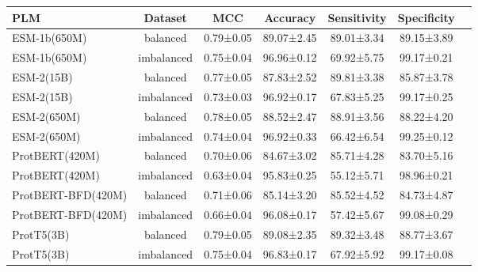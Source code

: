 \begin{tabular}{lcccccc}
\toprule
               PLM &    Dataset &       MCC &   Accuracy & Sensitivity & Specificity \\
\midrule
      ESM-1b(650M) &   balanced & 0.79±0.05 & 89.07±2.45 &  89.01±3.34 &  89.15±3.89 \\
      ESM-1b(650M) & imbalanced & 0.75±0.04 & 96.96±0.12 &  69.92±5.75 &  99.17±0.21 \\
        ESM-2(15B) &   balanced & 0.77±0.05 & 87.83±2.52 &  89.81±3.38 &  85.87±3.78 \\
        ESM-2(15B) & imbalanced & 0.73±0.03 & 96.92±0.17 &  67.83±5.25 &  99.17±0.25 \\
       ESM-2(650M) &   balanced & 0.78±0.05 & 88.52±2.47 &  88.91±3.56 &  88.22±4.20 \\
       ESM-2(650M) & imbalanced & 0.74±0.04 & 96.92±0.33 &  66.42±6.54 &  99.25±0.12 \\
    ProtBERT(420M) &   balanced & 0.70±0.06 & 84.67±3.02 &  85.71±4.28 &  83.70±5.16 \\
    ProtBERT(420M) & imbalanced & 0.63±0.04 & 95.83±0.25 &  55.12±5.71 &  98.96±0.21 \\
ProtBERT-BFD(420M) &   balanced & 0.71±0.06 & 85.14±3.20 &  85.52±4.52 &  84.73±4.87 \\
ProtBERT-BFD(420M) & imbalanced & 0.66±0.04 & 96.08±0.17 &  57.42±5.67 &  99.08±0.29 \\
        ProtT5(3B) &   balanced & 0.79±0.05 & 89.08±2.35 &  89.32±3.48 &  88.77±3.67 \\
        ProtT5(3B) & imbalanced & 0.75±0.04 & 96.83±0.17 &  67.92±5.92 &  99.17±0.08 \\
\bottomrule
\end{tabular}
